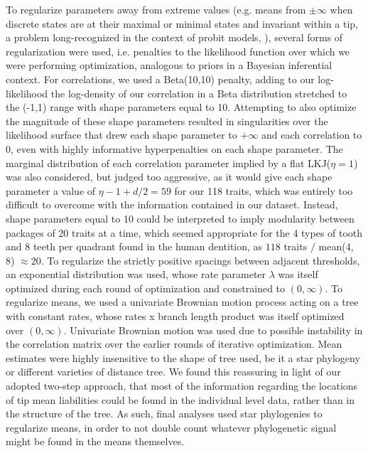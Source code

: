 \documentclass[10pt, twocolumn, twoside]{article}
\begin{document}
To regularize parameters away from extreme values (e.g. means from $\pm\infty$ when discrete states are at their maximal or minimal states and invariant within a tip, a problem long-recognized in the context of probit models, \citealt{fisherCaseZeroSurvivors1935}), several forms of regularization were used, i.e. penalties to the likelihood function over which we were performing optimization, analogous to priors in a Bayesian inferential context. For correlations, we used a Beta(10,10) penalty, adding to our log-likelihood the log-density of our correlation in a Beta distribution stretched to the (-1,1) range with shape parameters equal to 10. Attempting to also optimize the magnitude of these shape parameters resulted in singularities over the likelihood surface that drew each shape parameter to $+\infty$ and each correlation to 0, even with highly informative hyperpenalties on each shape parameter. The marginal distribution of each correlation parameter implied by a flat LKJ($\eta = 1$) was also considered, but judged too aggressive, as it would give each shape parameter a value of $\eta - 1 + d / 2 = 59$ for our 118 traits, which was entirely too difficult to overcome with the information contained in our dataset. Instead, shape parameters equal to 10 could be interpreted to imply modularity between packages of 20 traits at a time, which seemed appropriate for the 4 types of tooth and 8 teeth per quadrant found in the human dentition, as $118$ traits $/$ mean(4, 8) $\approx 20$. To regularize the strictly positive spacings between adjacent thresholds, an exponential distribution was used, whose rate parameter $\lambda$ was itself optimized during each round of optimization and constrained to $(0, \infty)$. To regularize means, we used a univariate Brownian motion process acting on a tree with constant rates, whose rates x branch length product was itself optimized over $(0, \infty)$. Univariate Brownian motion was used due to possible instability in the correlation matrix over the earlier rounds of iterative optimization. Mean estimates were highly insensitive to the shape of tree used, be it a star phylogeny or different varieties of distance tree. We found this reassuring in light of our adopted two-step approach, that most of the information regarding the locations of tip mean liabilities could be found in the individual level data, rather than in the structure of the tree. As such, final analyses used star phylogenies to regularize means, in order to not double count whatever phylogenetic signal might be found in the means themselves.
\end{document}

